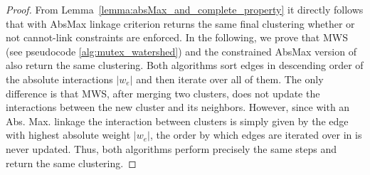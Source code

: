 \begin{proof}%
From Lemma~\ref{lemma:absMax_and_complete_property} it directly follows that \algname{} with AbsMax linkage criterion returns the same final clustering whether or not cannot-link constraints are enforced. In the following, we prove that MWS (see pseudocode \ref{alg:mutex_watershed}) and the constrained AbsMax version of \algname{} also return the same clustering.
Both algorithms sort edges in descending order of the absolute interactions $|w_e|$ and then iterate over all of them. The only difference is that MWS, after merging two clusters, does not update the interactions between the new cluster and its neighbors. 
However, since with an Abs. Max. linkage the interaction between clusters is simply given by the edge with highest absolute weight $|w_e|$, the order by which edges are iterated over in \algname{} is never updated. Thus, both algorithms perform precisely the same steps and return the same clustering.
\end{proof}

